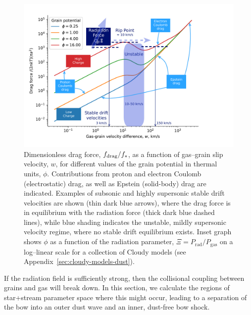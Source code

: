 \begin{figure}
  \includegraphics[width=\linewidth]{figs/gas-grain-drag-photoionized}
  \caption{Dimensionless drag force, \(f_{\text{drag}} / f_*\), as a function
    of gas--grain slip velocity, \(w\), for different values of the
    grain potential in thermal units, \(\phi\).  Contributions from
    proton and electron Coulomb (electrostatic) drag, as well as
    Epstein (solid-body) drag are indicated.  Examples of subsonic and
    highly supersonic stable drift velocities are shown (thin dark
    blue arrows), where the drag force is in equilibrium with the
    radiation force (thick dark blue dashed lines), while blue shading
    indicates the unstable, mildly supersonic velocity regime, where
    no stable drift equilibrium exists.  Inset graph shows \(\phi\) as a
    function of the radiation parameter,
    \(\Xi = P_{\mathrm{rad}} / P_{\mathrm{gas}}\) on a log--linear scale
    for a collection of Cloudy models (see
    Appendix~\ref{sec:cloudy-models-dust}).}
  \label{fig:gas-grain-drag-photoionized}
\end{figure}





If the radiation field is sufficiently strong, then the collisional
coupling between grains and gas will break down.  In this section, we
calculate the regions of star+stream parameter space where this might
occur, leading to a separation of the bow into an outer dust wave and
an inner, dust-free bow shock.

